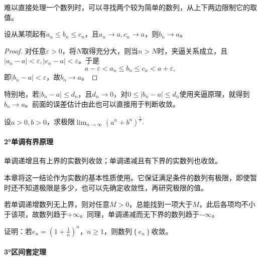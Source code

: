 难以直接处理一个数列时，可以寻找两个较为简单的数列，从上下两边限制它的取值。

\begin{theorem}[夹逼原理]
\label{thm:analysis-squeeze}
设从某项起有\(a_n\le b_n\le c_n\)，且\(a_n\to a,c_n\to a\)，则\(b_n\to a\)。
\end{theorem}

\begin{proof}
对任意\(\varepsilon>0\)，将\(N\)取得充分大，则当\(n>N\)时，夹逼关系成立，且\(|a_n-a|<\varepsilon,|c_n-a|<\varepsilon\)。于是
\begin{equation*}
 a-\varepsilon<a_n\le b_n\le c_n<a+\varepsilon,
\end{equation*}
即\(|b_n-a|<\varepsilon\)，故\(b_n\to a\)。
\end{proof}

特别地，若\(|b_n-a|\le d_n\)，且\(d_n\to0\)，对\(0\le|b_n-a|\le d_n\)使用夹逼原理，就得到\(b_n\to a\)。前面的误差估计由此也可以直接用于判断收敛。

\begin{example}
    设\(a > 0 , b > 0\)，求极限\(\lim_{n \to \infty} {\left( a^{n} + b^{n} \right)}^{\frac{1}{n}}\).
\end{example}

\newpage
\paragraph{2°单调有界原理} \mbox{}

\begin{theorem}[单调有界原理]
\label{thm:analysis-monotone-convergence}
单调递增且有上界的实数列收敛；单调递减且有下界的实数列也收敛。
\end{theorem}

本章将这一结论作为实数的基本性质使用。它保证满足条件的数列有极限，即使暂时还不知道极限是多少，也可以先确定收敛性，再研究极限的值。

若单调递增数列无上界，则对任意\(M>0\)，总能找到一项大于\(M\)，此后各项均不小于该项，故数列趋于\(+\infty\)。同理，单调递减而无下界的数列趋于\(-\infty\)。

\begin{example}
    证明：若\(e_{n} = {\left( 1 + \frac{1}{n} \right)}^{n}\)，\(n \ge 1\)，则数列\(\left\{ e_{n} \right\}\)收敛。
\end{example}

\paragraph{3°区间套定理} \mbox{}


